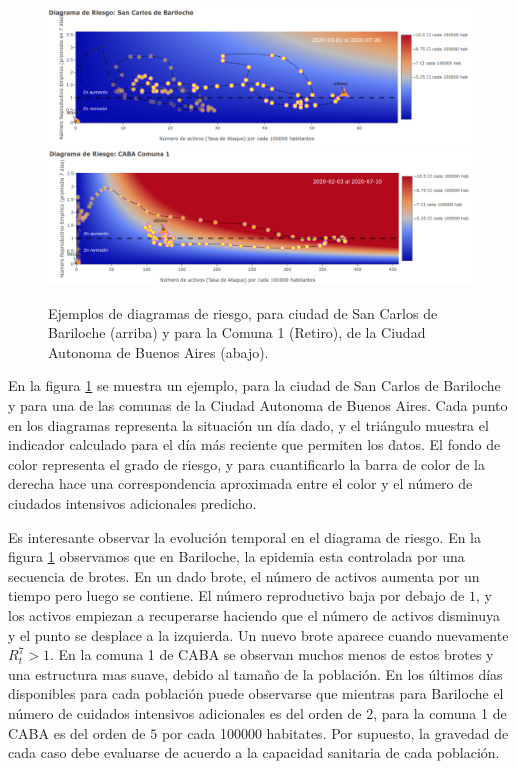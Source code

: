 \documentclass[12pt,a4paper]{article}
\begin{document}
\begin{figure}
\begin{center}
\includegraphics[width=14cm,clip=true]{bari.png}
\includegraphics[width=14cm,clip=true]{cabacomuna1.png}
\end{center}
\caption{
Ejemplos de diagramas de riesgo, para ciudad de San Carlos de 
Bariloche (arriba) y para la Comuna 1 (Retiro), de la Ciudad Autonoma de Buenos 
Aires (abajo).
}
\label{fig:bari}
\end{figure}
En la figura \ref{fig:bari} se muestra un ejemplo, para la ciudad 
de San Carlos de Bariloche y para una de las comunas de la 
Ciudad Autonoma de Buenos Aires. Cada punto en los diagramas 
representa la situación un día dado, y el triángulo muestra 
el indicador calculado para el día más reciente que permiten los datos.
El fondo de color representa el grado de riesgo, y para cuantificarlo 
la barra de color de la derecha hace una correspondencia aproximada 
entre el color y el número de ciudados intensivos adicionales predicho.


Es interesante observar la evolución temporal en el diagrama de riesgo.
En la figura \ref{fig:bari} observamos que en Bariloche, la epidemia 
esta controlada por una secuencia de brotes. 
En un dado brote, el número de 
activos aumenta por un tiempo pero luego se contiene. El 
número reproductivo baja por debajo de $1$, y los activos 
empiezan a recuperarse haciendo que el número de activos
disminuya y el punto se desplace a la izquierda. Un nuevo 
brote aparece cuando nuevamente $R^7_t>1$. 
En la comuna 1 de CABA se observan muchos menos de 
estos brotes y una estructura mas suave, debido al tamaño 
de la población. 
En los últimos días disponibles para cada población 
puede observarse que mientras para Bariloche el número de cuidados 
intensivos adicionales es del orden de $2$, para la comuna 1 de CABA
es del orden de $5$ por cada 100000 habitates. Por supuesto, 
la gravedad de cada caso debe evaluarse de acuerdo a la 
capacidad sanitaria de cada población.
\end{document}
